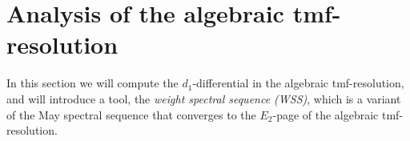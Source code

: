 \documentclass[10pt]{amsart}
\newcommand{\sslash}{\mathbin{/\mkern-6mu/}}
\newcommand{\mmod}{\! \sslash \!}
\newcommand{\ul}[1]{\underline{#1}}
\newcommand{\bo}{\mathrm{bo}}
\newcommand{\bou}{\ul{\bo}}
\theoremstyle{definition}
\numberwithin{equation}{section}
\numberwithin{figure}{section}
\DeclareMathOperator{\Ext}{Ext}
\begin{document}
%

\section{Analysis of the algebraic tmf-resolution}\label{sec:algtmfres}

In this section we will compute the $d_1$-differential in the algebraic tmf-resolution, and will introduce a tool, the \emph{weight spectral sequence (WSS)}, which is a variant of the May spectral sequence that converges to the $E_2$-page of the algebraic tmf-resolution.
\end{document}

